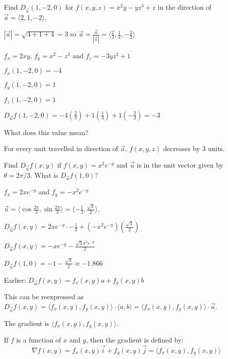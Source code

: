 \documentclass[../calc3.tex]{subfiles}
\begin{document}
\begin{example}
    Find $D_{\vec{u}}(1,-2,0)$ for $f(x,y,z)=x^2y-yz^3+z$ in the direction of $\vec{a}=\langle 2,1,-2\rangle$.

    $|\vec{a}|=\sqrt{4+1+4}=3$ so $\vec{u}=\frac{\vec{a}}{|\vec{a}|}=\langle \frac{2}{3},\frac{1}{3}, -\frac{2}{3}\rangle$

    $f_x=2xy$, $f_y=x^2-z^3$ and $f_z=-3yz^2+1$

    $f_x(1,-2,0)=-4$

    $f_y(1,-2,0)=1$

    $f_z(1,-2,0)=1$

    $D_{\vec{u}}f(1,-2,0)=-4\left(\frac{2}{3}\right)+1\left(\frac{1}{3}\right)+1\left(-\frac{2}{3}\right) = -3$

    What does this value mean?

    For every unit travelled in direction of $\vec{a}$, $f(x,y,z)$ decreases by 3 units.
\end{example}

\begin{example}
    Find $D_{\vec{u}}f(x,y)$ if $f(x,y)=x^2e^{-y}$ and $\vec{u}$ is in the unit vector given by $\theta = 2\pi/3$. What is $D_{\vec{u}}f(1,0)$?

    $f_x=2xe^{-y}$ and $f_y=-x^2e^{-y}$

    $\vec{u}=\langle \cos \frac{2\pi}{3}, \sin\frac{2\pi}{3}\rangle = \langle -\frac{1}{2}, \frac{\sqrt{3}}{2}\rangle$.

    $D_{\vec{u}}f(x,y)=2xe^{-y}\cdot -\frac{1}{2}+(-x^2e^{-y})\left( \frac{\sqrt{3}}{2}\right)$

    $D_{\vec{u}}f(x,y)=-xe^{-y}-\frac{\sqrt{3}x^2e^{-y}}{2}$

    $D_{\vec{u}}f(1,0)=-1-\frac{\sqrt{3}}{2}\approx -1.866$
\end{example}

Earlier: $D_{\vec{u}}f(x,y)=f_x(x,y)a+f_y(x,y)b$

This can be reexpressed as $D_{\vec{u}}f(x,y)=\langle f_x(x,y), f_y(x,y)\rangle\cdot \langle a,b\rangle = \langle f_x(x,y), f_y(x,y)\rangle\cdot \vec{u}$.

The gradient is $\langle f_x(x,y), f_y(x,y)\rangle$.

\begin{definition}
    If $f$ is a function of $x$ and $y$, then the gradient is defined by:
    \[ \nabla f(x,y)=f_x(x,y)\vec{i}+f_y(x,y)\vec{j} =\langle f_x(x,y), f_y(x,y)\rangle \]
\end{definition}
\end{document}
